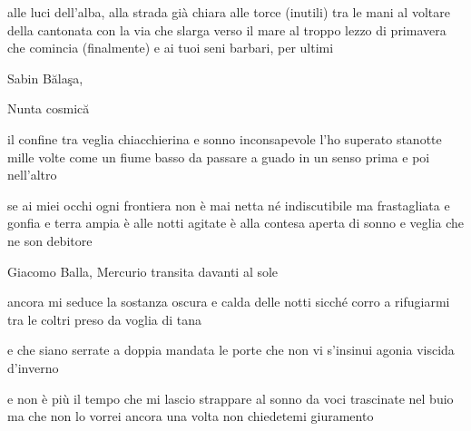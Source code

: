 \begin{poem}
	\begin{stanza}
		alle luci dell'alba, alla strada già chiara\verseline
		alle torce (inutili) tra le mani\verseline
		al voltare della cantonata\verseline
		con la via che slarga verso il mare\verseline
		al troppo\verseline
		lezzo di primavera che comincia\verseline
		(finalmente)\verseline
		e ai tuoi seni barbari, per ultimi
	\end{stanza}
\end{poem}

\clearpage


\begin{artItem}
	Sabin Bălaşa, \begin{otherlanguage}{romanian}%
		Nunta cosmică%
	\end{otherlanguage}
\end{artItem}

\begin{poem}
	\begin{stanza}
		il confine tra veglia chiacchierina\verseline
		e sonno inconsapevole\verseline
		l’ho superato stanotte mille volte\verseline
		come un fiume basso da passare a guado
		in un senso prima e poi nell’altro
	\end{stanza}

	\begin{stanza}
		se ai miei occhi ogni frontiera\verseline
		non è mai netta né indiscutibile\verseline
		ma frastagliata e gonfia e terra ampia\verseline
		è alle notti agitate è alla contesa aperta\verseline
		di sonno e veglia che ne son debitore
	\end{stanza}
\end{poem}

\clearpage


\begin{artItem}
	Giacomo Balla, Mercurio transita davanti al sole
\end{artItem}

\begin{poem}
	\begin{stanza}
		ancora mi seduce la sostanza oscura\verseline
		e calda delle notti sicché corro\verseline
		a rifugiarmi tra le coltri\verseline
		preso da voglia di tana
	\end{stanza}

	\begin{stanza}
		e che siano serrate a doppia mandata\verseline
		le porte che non vi s'insinui\verseline
		agonia viscida d'inverno
	\end{stanza}

	\begin{stanza}
		e non è più il tempo che mi lascio\verseline
		strappare al sonno\verseline
		da voci trascinate nel buio\verseline
		ma che non lo vorrei ancora una volta\verseline
		non chiedetemi giuramento
	\end{stanza}
\end{poem}


